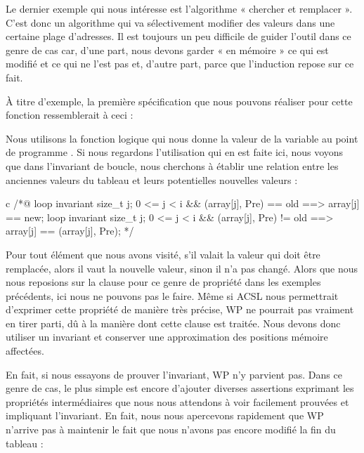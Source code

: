 \label{l4:statements-loops-ex-search-and-replace}


Le dernier exemple qui nous intéresse est l'algorithme « chercher et remplacer ». 
C'est donc un algorithme qui va sélectivement modifier des valeurs dans une 
certaine plage d'adresses. Il est toujours un peu difficile de guider l'outil 
dans ce genre de cas car, d'une part, nous devons garder « en mémoire » ce qui est modifié 
et ce qui ne l'est pas et, d'autre part, parce que l'induction repose sur ce fait.



À titre d'exemple, la première spécification que nous pouvons réaliser pour 
cette fonction ressemblerait à ceci :






Nous utilisons la fonction logique  qui nous donne la valeur de
la variable  au point de programme . Si nous regardons l'utilisation qui
en est faite ici, nous voyons que dans l'invariant de boucle, nous cherchons à 
établir une relation entre les anciennes valeurs du tableau et leurs potentielles 
nouvelles valeurs :



\begin{CodeBlock}{c}
/*@
  loop invariant \forall size_t j; 0 <= j < i && \at(array[j], Pre) == old 
                   ==> array[j] == new;
  loop invariant \forall size_t j; 0 <= j < i && \at(array[j], Pre) != old 
                   ==> array[j] == \at(array[j], Pre);
*/
\end{CodeBlock}


Pour tout élément que nous avons visité, s'il valait la valeur qui doit être
remplacée, alors il vaut la nouvelle valeur, sinon il n'a pas changé. Alors que
nous nous reposions sur la clause  pour ce genre de propriété
dans les exemples précédents, ici nous ne pouvons pas le faire. Même si ACSL nous
permettrait d'exprimer cette propriété de manière très précise, WP ne pourrait pas
vraiment en tirer parti, dû à la manière dont cette clause est traitée. Nous devons
donc utiliser un invariant et conserver une approximation des positions mémoire
affectées.

 
En fait, si nous essayons de prouver l'invariant, WP n'y parvient pas. Dans ce genre de 
cas, le plus simple est encore d'ajouter diverses assertions exprimant les 
propriétés intermédiaires que nous nous attendons à voir facilement prouvées 
et impliquant l'invariant. En fait, nous nous apercevons rapidement que WP 
n'arrive pas à maintenir le fait que nous n'avons pas encore modifié la fin du 
tableau :



